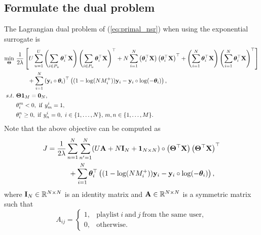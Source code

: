\subsection{Formulate the dual problem}
The Lagrangian dual problem of (\ref{eq:primal_nsr}) when using the exponential surrogate is
\begin{equation}
\label{eq:dual_nsr}
\begin{aligned}
\min_{\Thetabm} \ & \frac{1}{2 \lambda} \left[
     U \sum_{u=1}^U \left( \sum_{i \in P_u} \thetabm_i^\top \X \right) \left( \sum_{i \in P_u} \thetabm_i^\top \X \right)^\top
   + N \sum_{i=1}^N \left( \thetabm_i^\top \X \right) \left( \thetabm_i^\top \X \right)^\top
   + \left( \sum_{i=1}^N \thetabm_i^\top \X \right) \left( \sum_{i=1}^N \thetabm_i^\top \X \right)^\top \right] \\
& \hspace{2em}
   + \sum_{i=1}^N \left( \y_i \circ \thetabm_i \right)^\top \left( (1 - \log(N M_i^+)) \y_i - \y_i \circ \log(-\thetabm_i) \right), \\
s.t. \ 
& \Thetabm \one_M = \zero_N, \\
& \theta_i^m < 0, \ \mathrm{if} \ y_m^i = 1, \\
& \theta_i^n \ge 0, \ \mathrm{if} \ y_n^i = 0, \ i \in \{1,\dots,N\}, \, m,n \in \{1,\dots,M\}.
\end{aligned}
\end{equation}
Note that the above objective can be computed as
\begin{equation*}
\begin{aligned}
J &= \frac{1}{2 \lambda} \sum_{n=1}^N \sum_{n'=1}^N (U \mathbf{A} + N \mathbf{I}_N + \mathbf{1}_{N \times N}) 
     \circ \left( \mathbf{\Theta}^\top \mathbf{X} \right) \left( \mathbf{\Theta}^\top \mathbf{X} \right)^\top \\
& \hspace{3em}
     + \sum_{i=1}^N \bm{\theta}_i^\top \left( (1 - \log(N M_i^+)) \mathbf{y}_i - \mathbf{y}_i \circ \log(-\bm{\theta}_i) \right),
\end{aligned}
\end{equation*}
where $\mathbf{I}_N \in \mathbb{R}^{N \times N}$ is an identity matrix and $\mathbf{A} \in \mathbb{R}^{N \times N}$ is a symmetric matrix such that
\begin{equation*}
A_{ij} = 
\begin{cases}
1, & \text{playlist} \ i \ \text{and} \ j \ \text{from the same user}, \\
0, & \text{otherwise}.
\end{cases}
\end{equation*}

